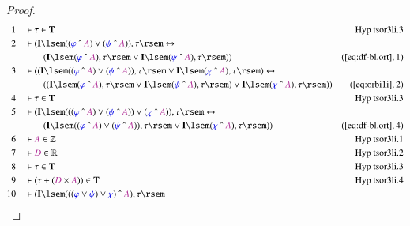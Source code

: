 \begin{proof}
\begin{align}
  1 &&  & \vdash \tau \in \mathbf{T}&\text{Hyp~tsor3li.3}\notag%
  \\ 2 &&  & \vdash ( \mathbf{I} \lsem ( ( \mw{\varphi} ~\string^~ \mc{A} )
      \vee ( \mw{\psi} ~\string^~ \mc{A} ) ) , \tau \rsem
      \leftrightarrow  \notag \\ & & & \qquad
     ( \mathbf{I} \lsem ( \mw{\varphi}
      ~\string^~ \mc{A} ) , \tau \rsem \vee \mathbf{I}
      \lsem ( \mw{\psi} ~\string^~ \mc{A} ) , \tau \rsem )
      )&(\mbox{\ref{eq:df-bl.ort}},1)\notag
  \\ 3 &&  & \vdash ( ( \mathbf{I} \lsem ( ( \mw{\varphi} ~\string^~ \mc{A} )
      \vee ( \mw{\psi} ~\string^~ \mc{A} ) ) , \tau \rsem
      \vee \mathbf{I} \lsem ( \mw{\chi} ~\string^~ \mc{A} )
      , \tau \rsem ) \leftrightarrow  \notag \\ & & & \qquad
     ( ( \mathbf{I} \lsem (
      \mw{\varphi} ~\string^~ \mc{A} ) , \tau \rsem \vee
      \mathbf{I} \lsem ( \mw{\psi} ~\string^~ \mc{A} ) ,
      \tau \rsem ) \vee \mathbf{I} \lsem ( \mw{\chi}
      ~\string^~ \mc{A} ) , \tau \rsem )
      )&(\mbox{\ref{eq:orbi1i}},2)\notag
  \\ 4 &&  & \vdash \tau \in \mathbf{T}&\text{Hyp~tsor3li.3}\notag%
  \\ 5 &&  & \vdash ( \mathbf{I} \lsem ( ( ( \mw{\varphi} ~\string^~ \mc{A} )
      \vee ( \mw{\psi} ~\string^~ \mc{A} ) ) \vee (
      \mw{\chi} ~\string^~ \mc{A} ) ) , \tau \rsem
      \leftrightarrow  \notag \\ & & & \qquad
     ( \mathbf{I} \lsem ( ( \mw{\varphi}
      ~\string^~ \mc{A} ) \vee ( \mw{\psi} ~\string^~
      \mc{A} ) ) , \tau \rsem \vee \mathbf{I} \lsem (
      \mw{\chi} ~\string^~ \mc{A} ) , \tau \rsem )
      )&(\mbox{\ref{eq:df-bl.ort}},4)\notag
  \\ 6 &&  & \vdash \mc{A} \in
      \mathbb{Z}&\text{Hyp~tsor3li.1}\notag%
  \\ 7 &&  & \vdash \mc{D} \in
      \mathbb{R}&\text{Hyp~tsor3li.2}\notag%
  \\ 8 &&  & \vdash \tau \in \mathbf{T}&\text{Hyp~tsor3li.3}\notag%
  \\ 9 &&  & \vdash ( \tau + ( \mc{D} \times \mc{A} ) ) \in
      \mathbf{T}&\text{Hyp~tsor3li.4}\notag%
  \\ 10 &&  & \vdash ( \mathbf{I} \lsem ( ( ( \mw{\varphi} \vee \mw{\psi} )
      \vee \mw{\chi} ) ~\string^~ \mc{A} ) , \tau \rsem

\end{align}
\end{proof}
